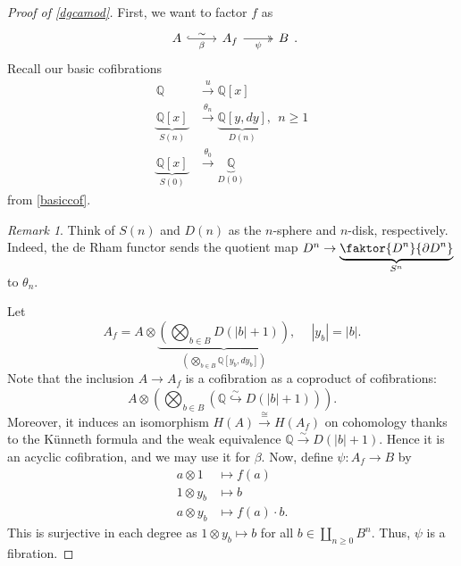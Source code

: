 \documentclass[10pt,letterpaper,cm]{nupset}
\theoremstyle{definition}
\theoremstyle{theorem}
\theoremstyle{remark}
\newtheorem{remark}[defn]{Remark}
\newcommand{\Q}{\mathbb Q}
\newcommand{\1}{\mathbb{1}}
\newcommand{\0}{\vec 0}
\begin{document}
\begin{proof}[Proof of \cref{dgcamod}]
First, we want to factor $f$ as 
\[
\begin{tikzcd}
	A & {A_f} & B
	\arrow["\sim", "\beta"', hook, from=1-1, to=1-2]
	\arrow["\psi"', two heads, from=1-2, to=1-3]
\end{tikzcd}
.\]  Recall our basic cofibrations  
\begin{align*}
 \Q & \xrightarrow{u} \Q\left[x\right]
\\  \underbrace{\Q\left[x\right]}_{S(n)} & \xrightarrow{\theta_n} \underbrace{\Q\left[y, d{y}\right]}_{D(n)},  \ \ n \geq 1
\\  \underbrace{\Q\left[x\right]}_{S(0)} & \xrightarrow{\theta_0} \underbrace{\Q}_{D(0)} 
\end{align*}
from \cref{basiccof}. 
\begin{remark}
Think of $S(n)$ and $D(n)$ as the $n$-sphere and $n$-disk, respectively. Indeed, the de Rham functor sends the quotient map $D^n \to \underbrace{\faktor{D^n}{\partial{D^n}}}_{S^n} $ to $\theta_n$. 
\end{remark}
Let 
\[
A_f  = A \otimes \underbrace{\left(\bigotimes_{b \in B} D(\left\lvert{b}\right\rvert +1)\right)}_{\left(\bigotimes_{b \in B}\Q\left[y_b, d{y_b}\right]\right)}, \ \quad \left\lvert{y_b}\right\rvert = \left\lvert{b}\right\rvert.
\] Note that the inclusion $A \to A_f$ is a cofibration as a coproduct of cofibrations:
\[
A \otimes \left(\bigotimes_{b \in B}\left(\Q \overset{\sim}{\hookrightarrow} D(\left\lvert{b}\right\rvert + 1)\right)\right).
\] Moreover, it induces an isomorphism $H(A) \xrightarrow{\cong} H(A_f)$ on cohomology thanks to the K\"unneth formula and the weak equivalence $\Q \xrightarrow{\sim} D(\left\lvert{b}\right\rvert + 1)$.  Hence it is an acyclic cofibration, and we may use it for $\beta$. Now, define $\psi : A_f \to B$ by 
\begin{align*}
a \otimes 1 & \mapsto f(a)
\\ 1 \otimes y_b &  \mapsto b
\\ a \otimes y_b & \mapsto f(a) \cdot b.
\end{align*}
This is surjective in each degree as $1 \otimes y_b \mapsto b$ for all $b\in \coprod_{n \geq 0} B^n$. Thus, $\psi$ is a fibration.


\end{proof}
\end{document}
